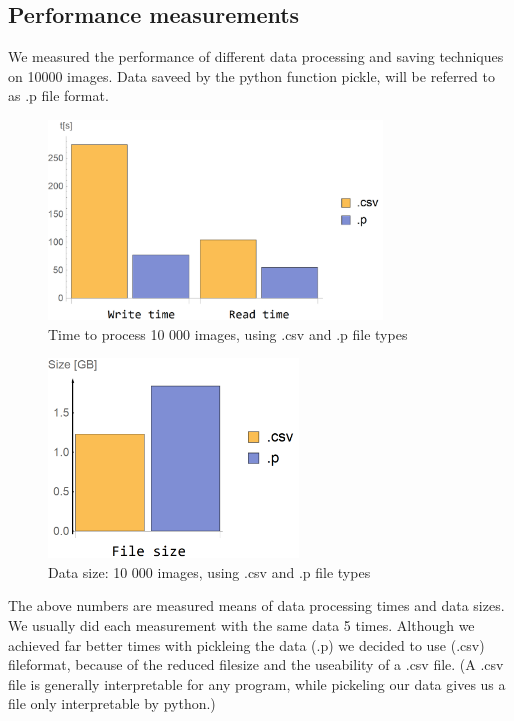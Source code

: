 \documentclass[12pt]{article}
\begin{document}
\subsection{Performance measurements}
We measured the performance of different data processing and saving techniques on 10000 images. Data saveed by the python function pickle, will be referred to as .p file format.
\begin{figure}[H]
	\centering
	\captionsetup{justification=centering}
	\includegraphics[height=150pt]{plot_2}
	\caption{Time to process 10 000 images, using .csv and .p file types}	
	\label{fig:data_proc_time}
\end{figure}
\begin{figure}[H]
	\centering
	\captionsetup{justification=centering}
	\includegraphics[height=150pt]{plot_1}
	\caption{Data size: 10 000 images, using .csv and .p file types}	
	\label{fig:data_proc_size}
\end{figure}
\noindent The above numbers are measured means of data processing times and data sizes. We usually did each measurement with the same data 5 times. Although we achieved far better times with pickleing the data (.p) we decided to use (.csv) fileformat, because of the reduced filesize and the useability of a .csv file. (A .csv file is generally interpretable for any program, while pickeling our data gives us a file only interpretable by python.)\newline\newline\newline
\end{document}
